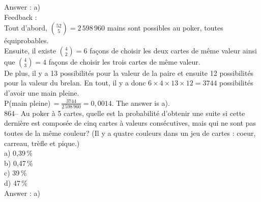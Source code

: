 \documentclass[letterpaper, 12pt]{article}
\begin{document}
Answer : a)\\

Feedback : \\
Tout d'abord, $\binom{52}{5}=2\,598\,960$ mains sont possibles au poker,
toutes \'equiprobables.  \\[2mm]
Ensuite, il existe $\binom{4}{2}=6$ fa\c cons de choisir les deux
cartes de m\^eme valeur ainsi que $\binom{4}{3}=4$ fa\c cons de choisir les
trois cartes de m\^eme valeur.  \\[2mm]
De plus, il y a 13 possibilit\'es pour la valeur de la paire et ensuite 12
possibilit\'es pour la valeur du brelan.  En tout, il y a donc
$6\times4\times13\times12=3744$ possibilit\'es d'avoir une main pleine.
\\[2mm]
P(main pleine)$\,=\frac{3744}{2\,598\,960}=0,0014$.  The answer is
a).\\[2mm]

864-- Au poker \`a 5 cartes, quelle est la probabilit\'e d'obtenir une suite
si cette derni\`ere est compos\'ee de cinq cartes \`a valeurs
cons\'ecutives, mais qui ne sont pas toutes de la m\^eme couleur? (Il y a
quatre couleurs dans un jeu de cartes : coeur, carreau, tr\`efle et
pique.)\\
a) 0,39\,\%\\
b) 0,47\,\%\\
c) 39\,\%\\
d) 47\,\%\\

Answer : a)\\
\end{document}
